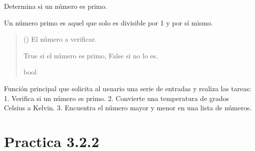 \documentclass[letterpaper,10pt,spanish]{sphinxmanual}
\begin{document}

\begin{fulllineitems}
\label{\detokenize{pr3:pr3.2_1.es_primo}}
\pysigstartsignatures
{}
\pysigstopsignatures
\sphinxAtStartPar
Determina si un número es primo.

\sphinxAtStartPar
Un número primo es aquel que solo es divisible por 1 y por sí mismo.
\begin{quote}\begin{description}
\sphinxAtStartPar
{} () \textendash{} El número a verificar.

\sphinxAtStartPar
True si el número es primo, False si no lo es.

\sphinxAtStartPar
bool

\end{description}\end{quote}

\end{fulllineitems}


\begin{fulllineitems}
\label{\detokenize{pr3:pr3.2_1.main}}
\pysigstartsignatures
{}
\pysigstopsignatures
\sphinxAtStartPar
Función principal que solicita al usuario una serie de entradas y realiza las tareas:
1. Verifica si un número es primo.
2. Convierte una temperatura de grados Celsius a Kelvin.
3. Encuentra el número mayor y menor en una lista de números.

\end{fulllineitems}



\section{Practica 3.2.2}
\label{\detokenize{pr3:module-pr3.2_2}}\label{\detokenize{pr3:practica-3-2-2}}
\end{document}
